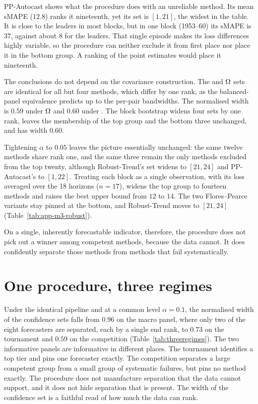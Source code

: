 PP-Autocast shows what the procedure does with an unreliable method. Its mean sMAPE
($12.8$) ranks it nineteenth, yet its set is $[1,21]$, the widest in the table. It is
close to the leaders in most blocks, but in one block (1953--60) its sMAPE is $37$,
against about $8$ for the leaders. That single episode makes its loss differences highly
variable, so the procedure can neither exclude it from first place nor place it in the
bottom group. A ranking of the point estimates would place it
nineteenth.

The conclusions do not depend on the covariance construction. The \MDS{} and
$\Omega$ sets are identical for all but four methods, which differ by one rank, as
the balanced-panel equivalence predicts up to the per-pair bandwidths. The normalised
width is $0.59$ under $\Omega$ and $0.60$ under \MDS{}. The block bootstrap widens
four sets by one rank, leaves the membership of the top group and the bottom three
unchanged, and has width $0.60$.

Tightening $\alpha$ to $0.05$ leaves the picture essentially unchanged: the same twelve methods share rank one,
and the same three remain the only methods excluded from the top twenty, although
Robust-Trend's set widens to $[21,24]$ and PP-Autocast's to $[1,22]$. Treating each
block as a single observation, with its loss averaged over the 18 horizons ($n=17$),
widens the top group to fourteen methods and raises the best upper bound from $12$ to
$14$. The two Flores--Pearce variants stay pinned at the bottom, and Robust-Trend moves
to $[21,24]$ (Table~\ref{tab:app-m3-robust}).

On a single, inherently forecastable indicator, therefore, the procedure does not pick
out a winner among competent methods, because the data cannot. It does confidently
separate those methods from methods that fail systematically.

\tabMcomp

\figMcompCaterpillar

\section{One procedure, three regimes}
\label{sec:apps-threeregimes}

Under the identical pipeline and at a common level $\alpha=0.1$, the normalised width of
the confidence sets falls from $0.96$ on the macro panel, where only two of the eight
forecasters are separated, each by a single end rank, to $0.73$ on the tournament and
$0.59$ on the competition (Table~\ref{tab:threeregimes}). The two informative panels
are informative in different places. The tournament identifies a top tier and pins one
forecaster exactly. The competition separates a large competent group from a small group
of systematic failures, but pins no method exactly. The procedure does not manufacture
separation that the data cannot support, and it does not hide separation that is
present. The width of the confidence set is a faithful read of how much the data can
rank.

\tabThreeRegimes

